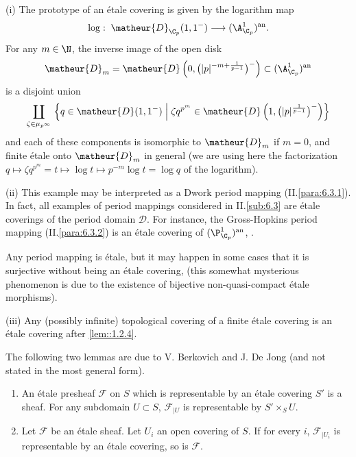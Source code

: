 \begin{exs}\label{exs::1.2.5}
  (i) The prototype of an \'etale covering is given by the logarithm map
	\begin{equation*}
	 \log:\; \matheur{D}_{\C_p}(1,1^-)\longrightarrow
	 (\A^1_{\C_p})^{\mathrm{an}}.
	\end{equation*}
	For any $m\in \N$, the inverse image of the open disk
	\begin{equation*}
	 \matheur{D}_m=\matheur{D}\left(0,
	 \bigl(|p|^{-m+\frac{1}{p-1}}\bigr)^-\right)
	 \subset (\A^1_{\C_p})^{\mathrm{an}}
	\end{equation*}
	is a disjoint union
	\begin{equation*}
	 \coprod_{\zeta \in \mu_{p^\infty}}\;\Bigl\{q\in
	  \matheur{D}(1,1^-) \Bigm| \zeta q^{p^m}\in 
	  \matheur{D}\left(1, \bigl(|p|^{\frac{1}{p-1}}\bigr)^-\right)\Bigr\}
	\end{equation*}
	and each of these components is isomorphic to $\matheur{D}_m$ if $m=0$,
	and finite \'etale onto $\matheur{D}_m$ in general (we are using
	here the 
	factorization $q\mapsto \zeta q^{p^m}=t\mapsto \log t \mapsto
	p^{-m}\log t =\log q$ of the logarithm).

  (ii) This example may be interpreted as a Dwork period
	mapping (II.\ref{para:6.3.1}). In fact, all examples of period
	mappings considered in II.\ref{sub:6.3} are \'etale coverings
	of the period domain 
	$\mathcal{D}$. For instance, the Gross-Hopkins period mapping  
	(II.\ref{para:6.3.2}) is an \'etale covering of $
	(\P^1_{\C_p})^{\mathrm{an}}$, \cf \cite[7.2]{efgonas}. 

	\noindent Any period mapping is \'etale, but it may happen in
	some cases that it is surjective without being an \'etale
	covering, \cf \cite[5.41]{psfpg} (this somewhat mysterious
	phenomenon is due to the existence of bijective
	non-quasi-compact \'etale morphisms).

  (iii) Any (possibly infinite) topological covering of a
	finite \'etale covering is an \'etale covering after \ref{lem::1.2.4}.
\end{exs}

The following two lemmas are due to V. Berkovich and J. De Jong (and not
stated in the most general form).
 
\begin{lem}\label{lem::1.2.6}
 \begin{enumerate}
  \item An \'etale presheaf $\mathcal{F}$ on $S$ which is representable
	by an \'etale covering $S'$ is a sheaf.  For any subdomain $U
	\subset S$, $\mathcal{F}_{|U}$ is representable by $S'\times_S
	U$.
  \item Let $\mathcal{F}$ be an \'etale sheaf. Let $U_i$ an
	open covering of $S$. If for every $i$, $\mathcal{F}_{|U_i}$ is
	representable by an \'etale covering, so is $\mathcal{F}$.
 \end{enumerate}
\end{lem}
 
